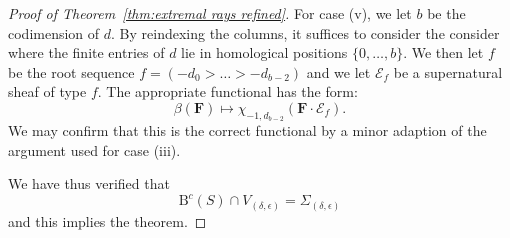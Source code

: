 \documentclass[12pt]{amsart}
\theoremstyle{definition}
\theoremstyle{remark}
\newcommand{\codim}{\operatorname{codim}}
\newcommand{\bb}{c}
\newcommand{\dd}{d}
\newcommand{\cE}{\mathcal{E}}
\newcommand{\FF}{\mathbf{F}}
\newcommand{\BBQ}{\mathrm{B}}
\begin{document}
\begin{proof}[Proof of Theorem~\ref{thm:extremal rays refined}]
For case (v), we let $b$ be the codimension of $\dd$.  By reindexing the columns, it suffices to consider the consider where the finite entries of $\dd$ lie in homological positions $\{0,\dots,b\}$.  We then let $f$ be the root sequence $f=(-d_0>\dots >-d_{b-2})$ and we let $\cE_f$ be a supernatural sheaf of type $f$.  The appropriate functional has the form:
\[
\beta(\FF)\mapsto \chi_{-1,d_{b-2}}(\FF\cdot \cE_f).
\]
We may confirm that this is the correct functional by a minor adaption of the argument used for case (iii).
%
%

We have thus verified that
\[
\BBQ^{\bb}(S)\cap V_{(\delta,\epsilon)}=\Sigma_{(\delta,\epsilon)}
\]
and this implies the theorem.
\end{proof}

\end{document}
